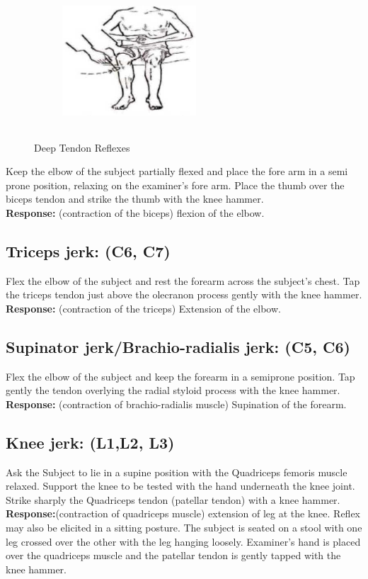 \documentclass[a4paper,12pt,openany,oneside]{book}
\begin{document}
{\begin{figure}[H]
		\begin{subfigure}[t]{.29\textwidth}
			\centering
			\includegraphics[width=5cm,height=5cm]{./clinicalPhysioPic/reflexes/kneeJerk_2.jpg}
		\end{subfigure}
		\caption*{Deep Tendon Reflexes}
	\end{figure}
}
Keep the elbow of the subject partially flexed and place the fore arm in a semi prone position, relaxing on the examiner's fore arm. Place the thumb over the biceps tendon and strike the thumb with the knee hammer.\\
\textbf{Response:} (contraction of the biceps) flexion of the elbow.
\subsection*{Triceps jerk: (C6, C7)}
Flex the elbow of the subject and rest the forearm across the subject's chest. Tap the triceps tendon just above the olecranon process gently with the knee hammer.\\
\textbf{Response:} (contraction of the triceps) Extension of the elbow.
\subsection*{Supinator jerk/Brachio-radialis jerk: (C5, C6)}
Flex the elbow of the subject and keep the forearm in a semiprone position. Tap gently the tendon overlying the radial styloid process with the knee hammer.\\
\textbf{Response:} (contraction of brachio-radialis muscle) Supination of the forearm.
\subsection*{Knee jerk: (L1,L2, L3)}
Ask the Subject to lie in a supine position with the Quadriceps femoris muscle relaxed. Support the knee to be tested with the hand underneath the knee joint. Strike sharply the Quadriceps tendon (patellar tendon) with a knee hammer.\\
\textbf{Response:}(contraction of quadriceps muscle) extension of leg at the knee. Reflex may also be elicited in a sitting posture. The subject is seated on a stool with one leg crossed over the other with the leg hanging loosely. Examiner's hand is placed over the quadriceps muscle and the patellar tendon is gently tapped with the knee hammer.
\end{document}
